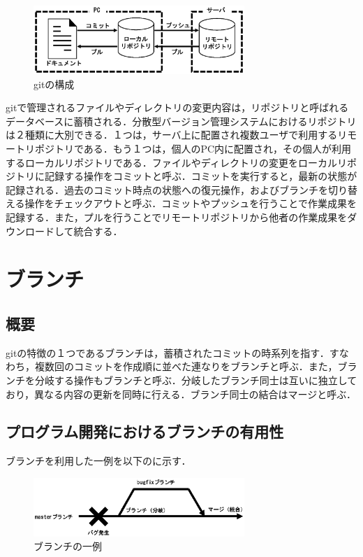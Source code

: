 \documentclass[a4j,9pt,twocolumn]{jsarticle}
\begin{document}
\begin{figure}[h]
\centering
\includegraphics[width=80mm]{img/git.eps}
\caption{gitの構成}
\label{git}
\end{figure}

gitで管理されるファイルやディレクトリの変更内容は，リポジトリと呼ばれるデータベースに蓄積される．分散型バージョン管理システムにおけるリポジトリは２種類に大別できる．１つは，サーバ上に配置され複数ユーザで利用するリモートリポジトリである．もう１つは，個人のPC内に配置され，その個人が利用するローカルリポジトリである．ファイルやディレクトリの変更をローカルリポジトリに記録する操作をコミットと呼ぶ．コミットを実行すると，最新の状態が記録される．過去のコミット時点の状態への復元操作，およびブランチを切り替える操作をチェックアウトと呼ぶ．コミットやプッシュを行うことで作業成果を記録する．また，プルを行うことでリモートリポジトリから他者の作業成果をダウンロードして統合する．

\section{ブランチ}
\subsection{概要}
gitの特徴の１つであるブランチは，蓄積されたコミットの時系列を指す．すなわち，複数回のコミットを作成順に並べた連なりをブランチと呼ぶ．また，ブランチを分岐する操作もブランチと呼ぶ．分岐したブランチ同士は互いに独立しており，異なる内容の更新を同時に行える．ブランチ同士の結合はマージと呼ぶ．

\subsection{プログラム開発におけるブランチの有用性}
ブランチを利用した一例を以下のに示す．

\begin{figure}[h]
\centering
\includegraphics[width=80mm]{img/branch.eps}
\caption{ブランチの一例}
\label{branch_ex}
\end{figure}
\end{document}
